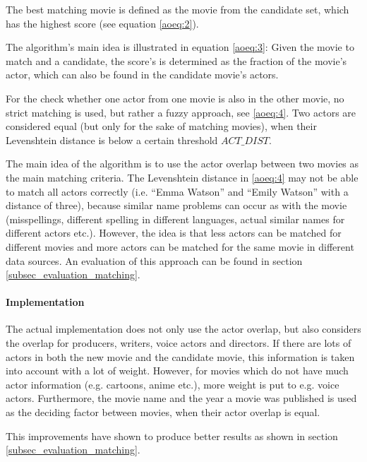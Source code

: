 The best matching movie is defined as the movie from the candidate set, which has the highest score (see equation \ref{aoeq:2}).

The algorithm's main idea is illustrated in equation \ref{aoeq:3}: Given the movie to match and a candidate, the score's is determined as the fraction of the movie's actor, which can also be found in the candidate movie's actors.

For the check whether one actor from one movie is also in the other movie, no strict matching is used, but rather a fuzzy approach, see \ref{aoeq:4}.
Two actors are considered equal (but only for the sake of matching movies), when their Levenshtein distance is below a certain threshold $ACT\_DIST$.

The main idea of the algorithm is to use the actor overlap between two movies as the main matching criteria.
The Levenshtein distance in \ref{aoeq:4} may not be able to match all actors correctly (i.e. "`Emma Watson"' and "`Emily Watson"' with a distance of three), because similar name problems can occur as with the movie (misspellings, different spelling in different languages, actual similar names for different actors etc.).
However, the idea is that less actors can be matched for different movies and more actors can be matched for the same movie in different data sources.
An evaluation of this approach can be found in section \ref{subsec_evaluation_matching}.

\paragraph{Implementation}
The actual implementation does not only use the actor overlap, but also considers the overlap for producers, writers, voice actors and directors.
If there are lots of actors in both the new movie and the candidate movie, this information is taken into account with a lot of weight.
However, for movies which do not have much actor information (e.g. cartoons, anime etc.), more weight is put to e.g. voice actors.
Furthermore, the movie name and the year a movie was published is used as the deciding factor between movies, when their actor overlap is equal.

This improvements have shown to produce better results as shown in section \ref{subsec_evaluation_matching}.

